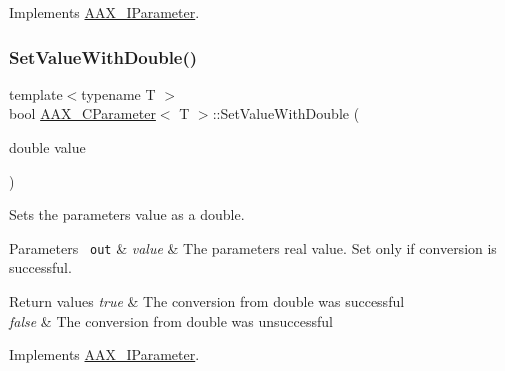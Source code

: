 Implements \mbox{\hyperlink{a01857_a1d37b80bc3a9c4e53fc2c1684f47dfb7}{A\+A\+X\+\_\+\+I\+Parameter}}.

\mbox{\label{a01537_a7551c4071f91cb48103b5a8dda8f73eb}} 
\subsubsection{\texorpdfstring{SetValueWithDouble()}{SetValueWithDouble()}\hspace{0.1cm}{\footnotesize\ttfamily [1/2]}}
{\footnotesize\ttfamily template$<$typename T $>$ \\
bool \mbox{\hyperlink{a01537}{A\+A\+X\+\_\+\+C\+Parameter}}$<$ T $>$\+::Set\+Value\+With\+Double (\begin{DoxyParamCaption}\item[{double}]{value }\end{DoxyParamCaption})\hspace{0.3cm}{\ttfamily [virtual]}}



Sets the parameter\textquotesingle{}s value as a double. 


\begin{DoxyParams}[1]{Parameters}
\mbox{\texttt{ out}}  & {\em value} & The parameter\textquotesingle{}s real value. Set only if conversion is successful.\\
\hline
\end{DoxyParams}

\begin{DoxyRetVals}{Return values}
{\em true} & The conversion from double was successful \\
\hline
{\em false} & The conversion from double was unsuccessful \\
\hline
\end{DoxyRetVals}


Implements \mbox{\hyperlink{a01857_a95e2d31931b586f43e42d41f2dce7c6d}{A\+A\+X\+\_\+\+I\+Parameter}}.

\mbox{\label{a01537_a0304e07f471e1a9dd804bbba7940281e}} 
